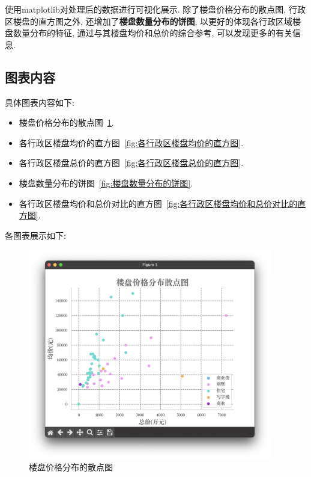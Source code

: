 使用matplotlib对处理后的数据进行可视化展示. 除了楼盘价格分布的散点图,
行政区楼盘的直方图之外, 还增加了\textbf{楼盘数量分布的饼图},
以更好的体现各行政区域楼盘数量分布的特征, 通过与其楼盘均价和总价的综合参考,
可以发现更多的有关信息.
\subsection{图表内容}
具体图表内容如下:
\begin{itemize}
    \item 楼盘价格分布的散点图~\ref{fig:楼盘价格分布的散点图}.
    \item 各行政区楼盘均价的直方图~\ref{fig:各行政区楼盘均价的直方图}.
    \item 各行政区楼盘总价的直方图~\ref{fig:各行政区楼盘总价的直方图}.
    \item 楼盘数量分布的饼图~\ref{fig:楼盘数量分布的饼图}.
    \item
        各行政区楼盘均价和总价对比的直方图~\ref{fig:各行政区楼盘均价和总价对比的直方图}.
\end{itemize}

各图表展示如下:
\begin{figure}[ht!]
    \begin{center}
        \includegraphics[width=0.95\textwidth]{figures/scatter.png}
    \end{center}
    \caption{楼盘价格分布的散点图}
    \label{fig:楼盘价格分布的散点图}
\end{figure}

